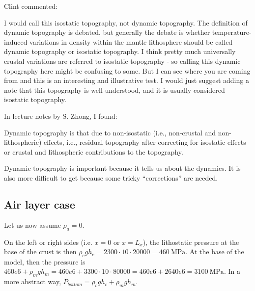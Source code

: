 Clint commented: 
\begin{displayquote}
{\color{darkgray}
I would call this isostatic topography, not dynamic topography. The definition 
of dynamic topography is debated, but generally the debate is whether temperature-induced variations 
in density within the mantle lithosphere should be called dynamic topography or isostatic topography. 
I think pretty much universally crustal variations are referred to isostatic topography - 
so calling this dynamic topography here might be confusing to some. 
But I can see where you are coming from and this is an interesting and illustrative test. 
I would just suggest adding a note that this topography is well-understood, and it is usually considered isostatic topography.
}
\end{displayquote}

In lecture notes by S. Zhong, I found:
\begin{displayquote}
{\color{darkgray}
Dynamic topography is that due to non-isostatic (i.e.,
non-crustal and non-lithospheric) effects, i.e.,
residual topography after correcting for isostatic
effects or crustal and lithospheric contributions to
the topography.

Dynamic topography is important because it tells us
about the dynamics. It is also more difficult to get
because some tricky ``corrections'' are needed.
}
\end{displayquote}




\newpage


\subsection*{Air layer case}

Let us now assume $\rho_a=0$. 

On the left or right sides (i.e. $x=0$ or $x=L_x$), the lithostatic pressure at the base of the crust is then 
$\rho_{c} g h_{c}=2300 \cdot 10 \cdot20000=460~\si{\mega\pascal}$.
At the base of the model, then the pressure is $460e6+\rho_{m} g h_{m}
=460e6+3300 \cdot 10 \cdot 80000=460e6+2640e6=3100~\si{\mega\pascal}$.
In a more abstract way, $P_{bottom}=\rho_c g h_c + \rho_m g h_m$.

